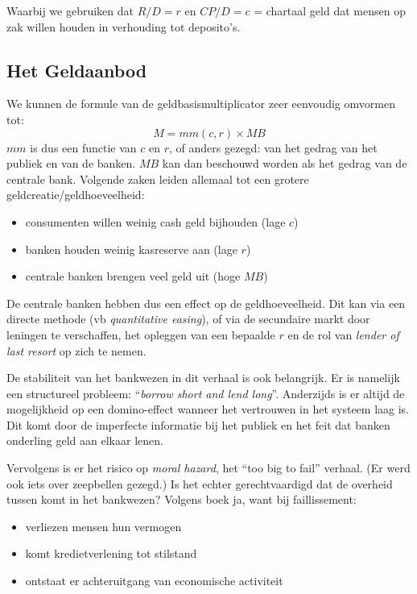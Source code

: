 Waarbij we gebruiken dat $R/D = r$ en $CP/D = c$ = chartaal geld dat mensen op zak willen houden in verhouding tot deposito's.

\subsection{Het Geldaanbod}
\label{sub:Het Geldaanbod}
We kunnen de formule van de geldbasismultiplicator zeer eenvoudig omvormen tot:
\begin{equation}
  M = mm(c,r) \times MB
\end{equation}
$mm$ is dus een functie van $c$ en $r$, of anders gezegd: van het gedrag van het publiek en van de banken. $MB$ kan dan beschouwd worden als het gedrag van de centrale bank. Volgende zaken leiden allemaal tot een grotere geldcreatie/geldhoeveelheid:

\begin{itemize}
  \item consumenten willen weinig cash geld bijhouden (lage $c$)
  \item banken houden weinig kasreserve aan (lage $r$)
  \item centrale banken brengen veel geld uit (hoge $MB$)
\end{itemize}

De centrale banken hebben dus een effect op de geldhoeveelheid. Dit kan via een directe methode (vb \textit{quantitative easing}), of via de secundaire markt door leningen te verschaffen, het opleggen van een bepaalde $r$ en de rol van \textit{lender of last resort} op zich te nemen.

De stabiliteit van het bankwezen in dit verhaal is ook belangrijk. Er is namelijk een structureel probleem: ``\textit{borrow short and lend long}''. Anderzijds is er altijd de mogelijkheid op een domino-effect wanneer het vertrouwen in het systeem laag is. Dit komt door de imperfecte informatie bij het publiek en het feit dat banken onderling geld aan elkaar lenen.

Vervolgens is er het risico op \textit{moral hazard}, het ``too big to fail'' verhaal. (Er werd ook iets over zeepbellen gezegd.) Is het echter gerechtvaardigd dat de overheid tussen komt in het bankwezen? Volgens boek ja, want bij faillissement:
\begin{itemize}
  \item verliezen mensen hun vermogen
  \item komt kredietverlening tot stilstand
  \item ontstaat er achteruitgang van economische activiteit
\end{itemize}


